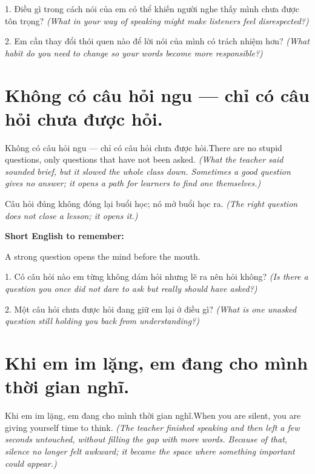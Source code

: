 \begin{tuhocnhanh}
1. Điều gì trong cách nói của em có thể khiến người nghe thấy mình chưa được tôn trọng? \textit{(What in your way of speaking might make listeners feel disrespected?)}

2. Em cần thay đổi thói quen nào để lời nói của mình có trách nhiệm hơn? \textit{(What habit do you need to change so your words become more responsible?)}
\end{tuhocnhanh}
\ngancach


\section{Không có câu hỏi ngu — chỉ có câu hỏi chưa được hỏi.}
\begin{truyen}{Không có câu hỏi ngu — chỉ có câu hỏi chưa được hỏi.}{There are no stupid questions, only questions that have not been asked.}
\textit{(What the teacher said sounded brief, but it slowed the whole class down. Sometimes a good question gives no answer; it opens a path for learners to find one themselves.)}
\end{truyen}

\begin{baihoc}
Câu hỏi đúng không đóng lại buổi học; nó mở buổi học ra.
\textit{(The right question does not close a lesson; it opens it.)}
\end{baihoc}

\begin{ghinhoanh}
\textbf{Short English to remember:}

A strong question opens the mind before the mouth.

\end{ghinhoanh}

\begin{tuhocnhanh}
1. Có câu hỏi nào em từng không dám hỏi nhưng lẽ ra nên hỏi không? \textit{(Is there a question you once did not dare to ask but really should have asked?)}

2. Một câu hỏi chưa được hỏi đang giữ em lại ở điều gì? \textit{(What is one unasked question still holding you back from understanding?)}
\end{tuhocnhanh}
\ngancach


\section{Khi em im lặng, em đang cho mình thời gian nghĩ.}
\begin{truyen}{Khi em im lặng, em đang cho mình thời gian nghĩ.}{When you are silent, you are giving yourself time to think.}
\textit{(The teacher finished speaking and then left a few seconds untouched, without filling the gap with more words. Because of that, silence no longer felt awkward; it became the space where something important could appear.)}
\end{truyen}

